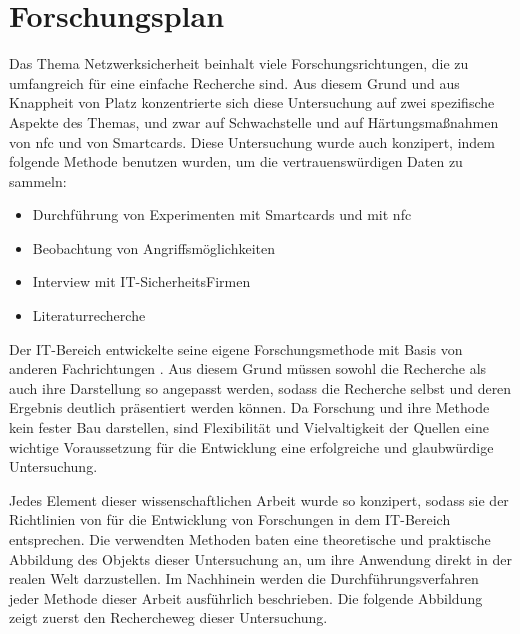 \section{Forschungsplan}

Das Thema Netzwerksicherheit beinhalt viele Forschungsrichtungen, die zu umfangreich für eine einfache
Recherche sind. Aus diesem Grund und aus Knappheit von Platz konzentrierte sich diese Untersuchung auf zwei
spezifische Aspekte des Themas, und zwar auf Schwachstelle und auf Härtungsmaßnahmen von \acrshort{nfc} und von Smartcards.
Diese Untersuchung wurde auch konzipert, indem folgende Methode benutzen wurden, um die vertrauenswürdigen
Daten zu sammeln:

\begin{itemize}
  \item Durchführung von Experimenten mit Smartcards und mit \acrshort{nfc}
  \item Beobachtung von Angriffsmöglichkeiten
  \item Interview mit IT-SicherheitsFirmen
  \item Literaturrecherche
\end{itemize}

Der IT-Bereich entwickelte seine eigene Forschungsmethode mit Basis von anderen Fachrichtungen \cite{inbook:AHDS}.
Aus diesem Grund müssen sowohl die Recherche als auch ihre Darstellung so angepasst werden, sodass die Recherche selbst
und deren Ergebnis deutlich präsentiert werden können. Da Forschung und ihre Methode kein fester Bau darstellen, 
sind Flexibilität und Vielvaltigkeit der Quellen eine wichtige Voraussetzung für die Entwicklung eine erfolgreiche und
glaubwürdige Untersuchung.


Jedes Element dieser wissenschaftlichen Arbeit wurde so konzipert, sodass sie der Richtlinien von \cite{refip:SGRM} für 
die Entwicklung von Forschungen in dem IT-Bereich entsprechen. Die verwendten Methoden baten eine theoretische
und praktische Abbildung des Objekts dieser Untersuchung an, um ihre Anwendung direkt in der realen Welt darzustellen. 
Im Nachhinein werden die Durchführungsverfahren jeder Methode dieser Arbeit ausführlich beschrieben. Die folgende Abbildung 
zeigt zuerst den Rechercheweg dieser Untersuchung.

